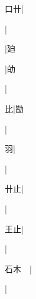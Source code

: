 \begin{multicols}{2}
{{\cjk{}{\cnsym{}　}口卄}|{}\par
{}|{}\par
{\cjk{}{\cnsym{}　}{\cnsym{}　}{\cnsym{}　}}|{\cjk{}廹}\par
{\cjk{}{\cnsym{}　}{\cnsym{}　}{\cnsym{}　}}|{\cjk{}劰}\par
{\cjk{}{\cnsym{}　}{\cnsym{}　}{\cnsym{}　}}|{}\par
{\cjk{}{\cnsym{}　}{\cnsym{}　}比}|{\cjk{}勓}\par
{\cjk{}{\cnsym{}　}{\cnsym{}　}{\cnsym{}　}}|{}\par
{\cjk{}{\cnsym{}　}{\cnsym{}　}羽}|{}\par
{\cjk{}{\cnsym{}　}{\cnsym{}　}{\cnsym{}　}}|{}\par
{\cjk{}{\cnsym{}　}卄止}|{}\par
{\cjk{}{\cnsym{}　}{\cnsym{}　}{\cnsym{}　}}|{}\par
{\cjk{}{\cnsym{}　}王止}|{}\par
{\cjk{}{\cnsym{}　}{\cnsym{}　}{\cnsym{}　}}|{}\par
{\cjk{}石木{\cnsym{}　}}|{}\par
{}|{}\par
}
\end{multicols}
